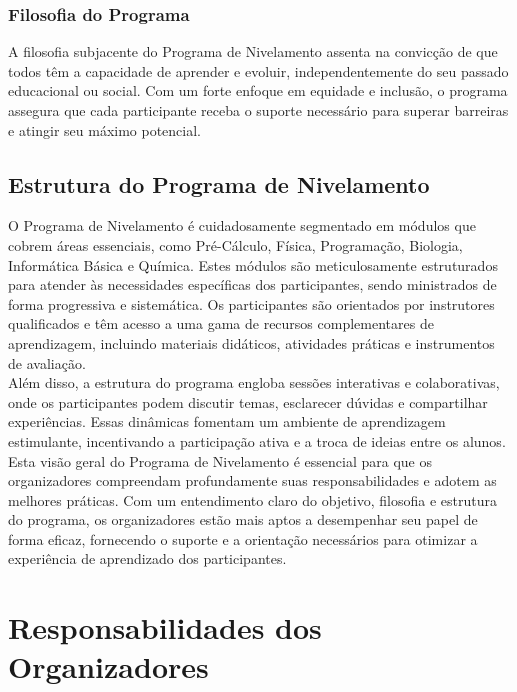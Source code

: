 \subsubsection{Filosofia do Programa}

A filosofia subjacente do Programa de Nivelamento assenta na convicção de que todos têm a capacidade de aprender e evoluir, independentemente do seu passado educacional ou social. Com um forte enfoque em equidade e inclusão, o programa assegura que cada participante receba o suporte necessário para superar barreiras e atingir seu máximo potencial.

\subsection{Estrutura do Programa de Nivelamento}

O Programa de Nivelamento é cuidadosamente segmentado em módulos que cobrem áreas essenciais, como Pré-Cálculo, Física, Programação, Biologia, Informática Básica e Química. Estes módulos são meticulosamente estruturados para atender às necessidades específicas dos participantes, sendo ministrados de forma progressiva e sistemática. Os participantes são orientados por instrutores qualificados e têm acesso a uma gama de recursos complementares de aprendizagem, incluindo materiais didáticos, atividades práticas e instrumentos de avaliação.\\

Além disso, a estrutura do programa engloba sessões interativas e colaborativas, onde os participantes podem discutir temas, esclarecer dúvidas e compartilhar experiências. Essas dinâmicas fomentam um ambiente de aprendizagem estimulante, incentivando a participação ativa e a troca de ideias entre os alunos.\\

Esta visão geral do Programa de Nivelamento é essencial para que os organizadores compreendam profundamente suas responsabilidades e adotem as melhores práticas. Com um entendimento claro do objetivo, filosofia e estrutura do programa, os organizadores estão mais aptos a desempenhar seu papel de forma eficaz, fornecendo o suporte e a orientação necessários para otimizar a experiência de aprendizado dos participantes.

\section{Responsabilidades dos Organizadores}

